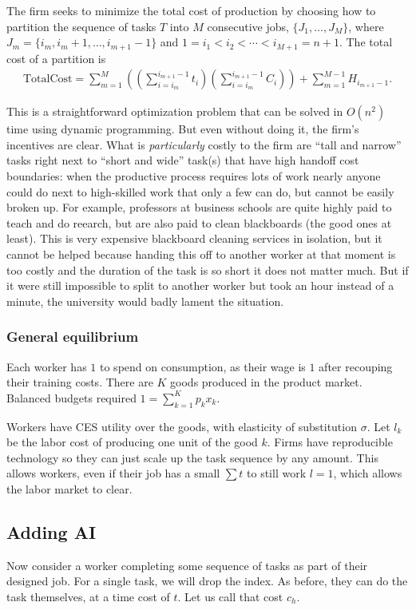 \documentclass{article}
\begin{document}
The firm seeks to minimize the total cost of production by choosing how to partition the sequence of tasks $T$ into $M$ consecutive jobs, $\{J_1, \dots, J_M\}$, where $J_m = \{i_m, i_m+1, \dots, i_{m+1}-1\}$ and $1 = i_1 < i_2 < \cdots < i_{M+1} = n+1$. 
The total cost of a partition is
\begin{align*}
\text{TotalCost} = \sum_{m=1}^M \left(\left(\sum_{i = i_m}^{i_{m+1}-1} t_i\right)\left(\sum_{i = i_m}^{i_{m+1}-1} C_i\right)\right) + \sum_{m=1}^{M-1} H_{i_{m+1}-1}.
\end{align*}

This is a straightforward optimization problem that can be solved in $O(n^2)$ time using dynamic programming.
But even without doing it, the firm's incentives are clear. 
What is \emph{particularly} costly to the firm are ``tall and narrow'' tasks right next to ``short and wide'' task(s) that have high handoff cost boundaries: when the productive process requires lots of work nearly anyone could do next to high-skilled work that only a few can do, but cannot be easily broken up.
For example, professors at business schools are quite highly paid to teach and do reearch, but are also paid to clean blackboards (the good ones at least). 
This is very expensive blackboard cleaning services in isolation, but it cannot be helped because handing this off to another worker at that moment is too costly and the duration of the task is so short it does not matter much. 
But if it were still impossible to split to another worker but took an hour instead of a minute, the university would badly lament the situation.

\subsubsection{General equilibrium}
Each worker has $1$ to spend on consumption, as their wage is $1$ after recouping their training costs.
There are $K$ goods produced in the product market. 
Balanced budgets required $1 = \sum_{k=1}^K p_k x_k$.

Workers have CES utility over the goods, with elasticity of substitution $\sigma$.
Let $l_k$ be the labor cost of producing one unit of the good $k$.
Firms have reproducible technology so they can just scale up the task sequence by any amount. 
This allows workers, even if their job has a small $\sum t$ to still work $l = 1$, which allows the labor market to clear.

\subsection{Adding AI} \label{sec:model}
Now consider a worker completing some sequence of tasks as part of their designed job.
For a single task, we will drop the index. 
As before, they can do the task themselves, at a time cost of $t$.
Let us call that cost $c_h$.
\end{document}
